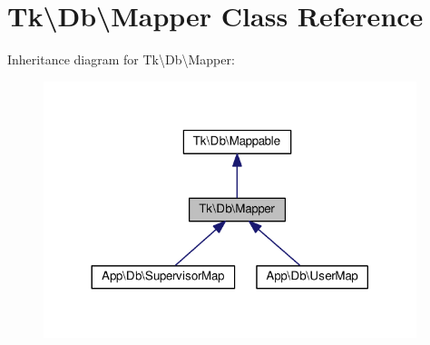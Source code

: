\hypertarget{classTk_1_1Db_1_1Mapper}{\section{Tk\textbackslash{}Db\textbackslash{}Mapper Class Reference}
\label{classTk_1_1Db_1_1Mapper}
}


Inheritance diagram for Tk\textbackslash{}Db\textbackslash{}Mapper\+:\nopagebreak
\begin{figure}[H]
\begin{center}
\leavevmode
\includegraphics[width=308pt]{classTk_1_1Db_1_1Mapper__inherit__graph}
\end{center}
\end{figure}
